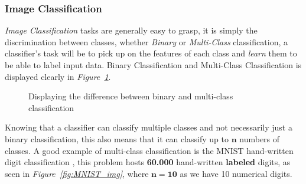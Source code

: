 \documentclass[12pt]{extarticle}
\begin{document}
	\subsubsection{Image Classification}\label{Classification}
	\emph{Image Classification} tasks are generally easy to grasp, it is simply the discrimination between classes, whether \emph{Binary} or \emph{Multi-Class} classification, a classifier's task will be to pick up on the features of each class and \emph{learn} them to be able to label input data. Binary Classification and Multi-Class Classification is displayed clearly in \emph{Figure~\ref{fig:class}}.
	\begin{figure}
		\centering
		\qquad
		\caption{Displaying the difference between binary and multi-class classification}
		\label{fig:class}
	\end{figure}
	Knowing that a classifier can classify multiple classes and not necessarily just a binary classification, this also means that it can classify up to $\bm{n}$ numbers of classes. A good example of multi-class classification is the MNIST hand-written digit classification \cite{mnist}, this problem hosts \textbf{60.000} hand-written \textbf{labeled} digits, as seen in \emph{Figure~\ref{fig:MNIST_img}}, where $\bm{n = 10}$ as we have 10 numerical digits. 
\end{document}
